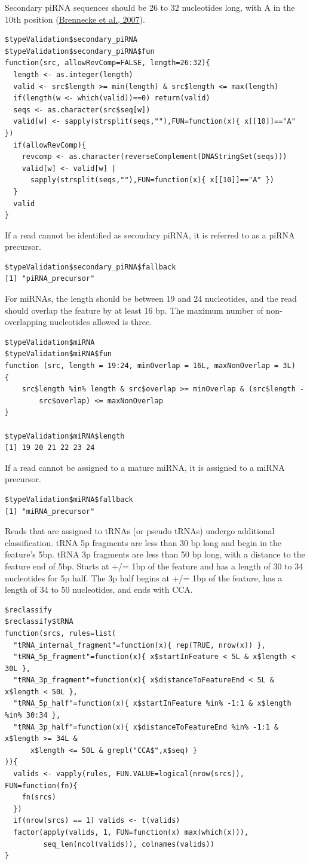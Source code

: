 \documentclass[12pt,twoside]{reedthesis}
\begin{document}
Secondary piRNA sequences should be 26 to 32 nucleotides long, with A in
the 10th position (\protect\hyperlink{ref-brennecke2007}{Brennecke et al., 2007}).
\begin{verbatim}
$typeValidation$secondary_piRNA
$typeValidation$secondary_piRNA$fun
function(src, allowRevComp=FALSE, length=26:32){
  length <- as.integer(length)
  valid <- src$length >= min(length) & src$length <= max(length)
  if(length(w <- which(valid))==0) return(valid)
  seqs <- as.character(src$seq[w])
  valid[w] <- sapply(strsplit(seqs,""),FUN=function(x){ x[[10]]=="A" })
  if(allowRevComp){
    revcomp <- as.character(reverseComplement(DNAStringSet(seqs)))
    valid[w] <- valid[w] |
      sapply(strsplit(seqs,""),FUN=function(x){ x[[10]]=="A" })
  }
  valid
}
\end{verbatim}
If a read cannot be identified as secondary piRNA, it is referred to as
a piRNA precursor.
\begin{verbatim}
$typeValidation$secondary_piRNA$fallback
[1] "piRNA_precursor"
\end{verbatim}
For miRNAs, the length should be between 19 and 24 nucleotides, and the
read should overlap the feature by at least 16 bp. The maximum number of
non-overlapping nucleotides allowed is three.
\begin{verbatim}
$typeValidation$miRNA
$typeValidation$miRNA$fun
function (src, length = 19:24, minOverlap = 16L, maxNonOverlap = 3L)
{
    src$length %in% length & src$overlap >= minOverlap & (src$length -
        src$overlap) <= maxNonOverlap
}

$typeValidation$miRNA$length
[1] 19 20 21 22 23 24
\end{verbatim}
If a read cannot be assigned to a mature miRNA, it is assigned to a
miRNA precursor.
\begin{verbatim}
$typeValidation$miRNA$fallback
[1] "miRNA_precursor"
\end{verbatim}
Reads that are assigned to tRNAs (or pseudo tRNAs) undergo additional
classification. tRNA 5p fragments are less than 30 bp long and begin in
the feature's 5bp. tRNA 3p fragments are less than 50 bp long, with a
distance to the feature end of 5bp. Starts at +/= 1bp of the feature and
has a length of 30 to 34 nucleotides for 5p half. The 3p half begins at
+/= 1bp of the feature, has a length of 34 to 50 nucleotides, and ends
with CCA.
\begin{verbatim}
$reclassify
$reclassify$tRNA
function(srcs, rules=list(
  "tRNA_internal_fragment"=function(x){ rep(TRUE, nrow(x)) },
  "tRNA_5p_fragment"=function(x){ x$startInFeature < 5L & x$length < 30L },
  "tRNA_3p_fragment"=function(x){ x$distanceToFeatureEnd < 5L & x$length < 50L },
  "tRNA_5p_half"=function(x){ x$startInFeature %in% -1:1 & x$length %in% 30:34 },
  "tRNA_3p_half"=function(x){ x$distanceToFeatureEnd %in% -1:1 & x$length >= 34L &
      x$length <= 50L & grepl("CCA$",x$seq) }
)){
  valids <- vapply(rules, FUN.VALUE=logical(nrow(srcs)), FUN=function(fn){
    fn(srcs)
  })
  if(nrow(srcs) == 1) valids <- t(valids)
  factor(apply(valids, 1, FUN=function(x) max(which(x))),
         seq_len(ncol(valids)), colnames(valids))
}
\end{verbatim}
\end{document}
